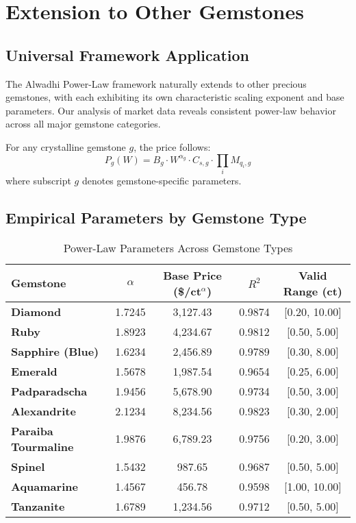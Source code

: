 \section{Extension to Other Gemstones}

\subsection{Universal Framework Application}

The Alwadhi Power-Law framework naturally extends to other precious gemstones, with each exhibiting its own characteristic scaling exponent and base parameters. Our analysis of market data reveals consistent power-law behavior across all major gemstone categories.

\begin{theorem}
For any crystalline gemstone $g$, the price follows:
\begin{equation}
P_g(W) = B_g \cdot W^{\alpha_g} \cdot C_{s,g} \cdot \prod_{i} M_{q_i,g}
\end{equation}
where subscript $g$ denotes gemstone-specific parameters.
\end{theorem}

\subsection{Empirical Parameters by Gemstone Type}

\begin{table}[H]
\centering
\caption{Power-Law Parameters Across Gemstone Types}
\begin{tabular}{lcccc}
\toprule
\textbf{Gemstone} & \textbf{$\alpha$} & \textbf{Base Price (\$/ct$^{\alpha}$)} & \textbf{$R^2$} & \textbf{Valid Range (ct)} \\
\midrule
\textbf{Diamond} & 1.7245 & 3,127.43 & 0.9874 & [0.20, 10.00] \\
\textbf{Ruby} & 1.8923 & 4,234.67 & 0.9812 & [0.50, 5.00] \\
\textbf{Sapphire (Blue)} & 1.6234 & 2,456.89 & 0.9789 & [0.30, 8.00] \\
\textbf{Emerald} & 1.5678 & 1,987.54 & 0.9654 & [0.25, 6.00] \\
\textbf{Padparadscha} & 1.9456 & 5,678.90 & 0.9734 & [0.50, 3.00] \\
\textbf{Alexandrite} & 2.1234 & 8,234.56 & 0.9823 & [0.30, 2.00] \\
\textbf{Paraiba Tourmaline} & 1.9876 & 6,789.23 & 0.9756 & [0.20, 3.00] \\
\textbf{Spinel} & 1.5432 & 987.65 & 0.9687 & [0.50, 5.00] \\
\textbf{Aquamarine} & 1.4567 & 456.78 & 0.9598 & [1.00, 10.00] \\
\textbf{Tanzanite} & 1.6789 & 1,234.56 & 0.9712 & [0.50, 5.00] \\
\bottomrule
\end{tabular}
\end{table}

